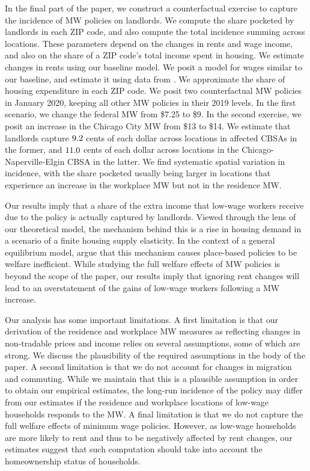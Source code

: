 
In the final part of the paper, we construct a counterfactual exercise to 
capture the incidence of MW policies on landlords.
We compute the share pocketed by landlords in each ZIP code, and also
compute the total incidence summing across locations.
These parameters depend on the changes in rents and wage income, and also on the 
share of a ZIP code's total income spent in housing.
We estimate changes in rents using our baseline model.
We posit a model for wages similar to our baseline, and estimate it using 
data from \textcite{IRS}.
We approximate the share of housing expenditure in each ZIP code.
We posit two counterfactual MW policies in January 2020, keeping all other
MW policies in their 2019 levels.
In the first scenario, we change the federal MW from \$7.25 to \$9.
In the second exercise, we posit an increase in the Chicago City MW 
from \$13 to \$14.
We estimate that landlords capture $\textnormal{9.2}$ cents of each 
dollar across locations in affected CBSAs in the former, and 
$\textnormal{11.0}$ cents of each dollar across locations in the 
Chicago-Naperville-Elgin CBSA in the latter.
We find systematic spatial variation in incidence,
with the share pocketed usually being larger in locations that experience an
increase in the workplace MW but not in the residence MW.

Our results imply that a share of the extra income that low-wage workers
receive due to the policy is actually captured by landlords.
Viewed through the lens of our theoretical model,
the mechanism behind this is a rise in housing demand in a scenario of a 
finite housing supply elasticity.
In the context of a general equilibrium model, \textcite{KlineMoretti2014} argue
that this mechanism causes place-based policies to be welfare inefficient.
While studying the full welfare effects of MW policies is beyond the scope of 
the paper, our results imply that ignoring rent changes will lead to an 
overstatement of the gains of low-wage workers following a MW increase.

Our analysis has some important limitations.
A first limitation is that our derivation of the residence and workplace MW
measures as reflecting changes in non-tradable prices and income relies on 
several assumptions, some of which are strong.
We discuss the plausibility of the required assumptions in the body of the paper.
A second limitation is that we do not account for changes in migration and 
commuting.
While we maintain that this is a plausible assumption in order to obtain our 
empirical estimates, the long-run incidence of the policy may differ from our 
estimates if the residence and workplace locations of low-wage households 
responds to the MW.
A final limitation is that we do not capture the full welfare effects of minimum
wage policies.
However, as low-wage households are more likely to rent and thus to be 
negatively affected by rent changes, our estimates suggest that such 
computation should take into account the homeownership status of households.


